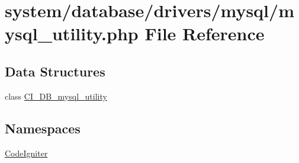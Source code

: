 \hypertarget{mysql__utility_8php}{\section{system/database/drivers/mysql/mysql\-\_\-utility.php File Reference}
\label{mysql__utility_8php}
}
\subsection*{Data Structures}
\begin{DoxyCompactItemize}
\item 
class \hyperlink{class_c_i___d_b__mysql__utility}{C\-I\-\_\-\-D\-B\-\_\-mysql\-\_\-utility}
\end{DoxyCompactItemize}
\subsection*{Namespaces}
\begin{DoxyCompactItemize}
\item 
\hyperlink{namespace_code_igniter}{Code\-Igniter}
\end{DoxyCompactItemize}
